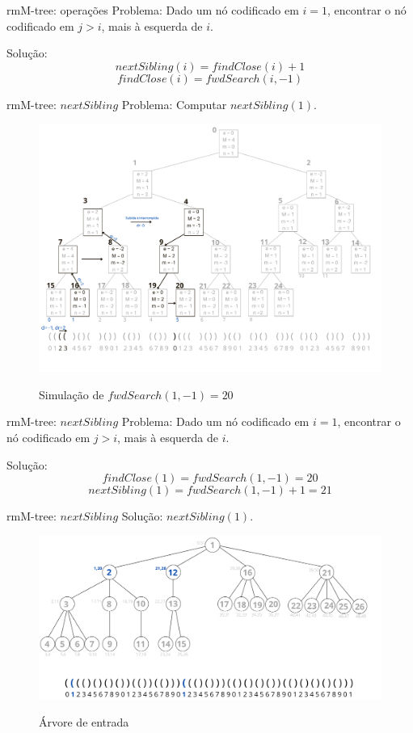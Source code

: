 \begin{frame}{rmM-tree: operações}
    Problema: Dado um nó codificado em $i=1$, encontrar o nó codificado em $j>i$, mais à esquerda de $i$.

    Solução: 
    $$nextSibling(i) = findClose(i) +1$$ 
    $$findClose(i) = fwdSearch(i,-1)$$ 
 \end{frame}

 \begin{frame}{rmM-tree: $nextSibling$}
    Problema: Computar $nextSibling(1)$.
     \begin{figure}[h!]
         \centering
         \includegraphics[scale=0.27]{images/rmm-tree-bin-fwdSearch.png}\\
         \caption{Simulação de $fwdSearch(1,-1)=20$}
     \end{figure} 
 \end{frame}

 \begin{frame}{rmM-tree: $nextSibling$}
    Problema: Dado um nó codificado em $i=1$, encontrar o nó codificado em $j>i$, mais à esquerda de $i$.

    Solução: 
    $$findClose(1) = fwdSearch(1,-1) = 20 $$ 
    $$nextSibling(1) = fwdSearch(1,-1) + 1 = 21 $$ 
 \end{frame}

 \begin{frame}{rmM-tree: $nextSibling$}
    Solução:  $nextSibling(1)$.
     \begin{figure}[h!]
         \centering
         \includegraphics[scale=0.40]{images/nextSibling-res.png}\\
         \caption{Árvore de entrada}
     \end{figure} 
 \end{frame}

